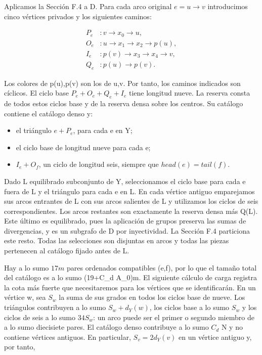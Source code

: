 \documentclass[spanish,11pt,a4paper]{article}
\providecommand{\tightlist}{\setlength{\itemsep}{0pt}\setlength{\parskip}{0pt}}
\begin{document}
Aplicamos la Sección F.4 a D. Para cada arco original \(e=u\to v\) introducimos cinco vértices privados y los siguientes caminos:

\[\begin{aligned}P_e&:v\to x_0\to u,\\O_e&:u\to x_1\to x_2\to p(u),\\I_e&:p(v)\to x_3\to x_4\to v,\\Q_e&:p(u)\to p(v).\end{aligned}\]

Los colores de p(u),p(v) son los de u,v. Por tanto, los caminos indicados son cíclicos. El ciclo base \(P_{e}+O_{e}+Q_{e}+I_{e}\) tiene longitud nueve. La reserva consta de todos estos ciclos base y de la reserva densa sobre los centros. Su catálogo contiene el catálogo denso y:

\begin{itemize}
\tightlist
\item
  el triángulo \(e+P_{e}\), para cada e en Y;
\item
  el ciclo base de longitud nueve para cada e;
\item
  \(I_{e}+O_{f}\), un ciclo de longitud seis, siempre que \(head(e)=tail(f)\).
\end{itemize}

Dado L equilibrado subconjunto de Y, seleccionamos el ciclo base para cada e fuera de L y el triángulo para cada e en L. En cada vértice antiguo emparejamos sus arcos entrantes de L con sus arcos salientes de L y utilizamos los ciclos de seis correspondientes. Los arcos restantes son exactamente la reserva densa más Q(L). Este último es equilibrado, pues la aplicación de grupos preserva las sumas de divergencias, y es un subgrafo de D por inyectividad. La Sección F.4 particiona este resto. Todas las selecciones son disjuntas en arcos y todas las piezas pertenecen al catálogo fijado antes de L.

Hay a lo sumo \(17m\) pares ordenados compatibles (e,f), por lo que el tamaño total del catálogo es a lo sumo (19+C\_d A\_0)m. El siguiente cálculo de carga registra la cota más fuerte que necesitaremos para los vértices que se identificarán. En un vértice w, sea \(S_{w}\) la suma de sus grados en todos los ciclos base de nueve. Los triángulos contribuyen a lo sumo \(S_{w}+d_{Y}(w)\), los ciclos base a lo sumo \(S_{w}\) y los ciclos de seis a lo sumo \(34S_{w}\): un arco puede ser el primer o segundo miembro de a lo sumo diecisiete pares. El catálogo denso contribuye a lo sumo \(C_{d}\) N y no contiene vértices antiguos. En particular, \(S_{v}=2d_{Y}(v)\) en un vértice antiguo y, por tanto,
\end{document}
